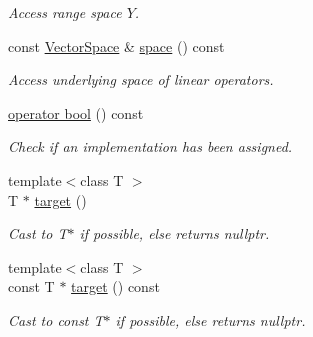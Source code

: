 \begin{DoxyCompactItemize}
\begin{DoxyCompactList}\small\item\em Access range space $Y$. \end{DoxyCompactList}\item 
\hypertarget{classSpacy_1_1LinearOperator_ad0116ec957dfb6bc490a4c9702929f8e}{}const \hyperlink{classSpacy_1_1VectorSpace}{Vector\+Space} \& \hyperlink{classSpacy_1_1LinearOperator_ad0116ec957dfb6bc490a4c9702929f8e}{space} () const \label{classSpacy_1_1LinearOperator_ad0116ec957dfb6bc490a4c9702929f8e}

\begin{DoxyCompactList}\small\item\em Access underlying space of linear operators. \end{DoxyCompactList}\item 
\hypertarget{classSpacy_1_1LinearOperator_a39ea1a7871cbd2ce8f9029298f691bef}{}\hyperlink{classSpacy_1_1LinearOperator_a39ea1a7871cbd2ce8f9029298f691bef}{operator bool} () const \label{classSpacy_1_1LinearOperator_a39ea1a7871cbd2ce8f9029298f691bef}

\begin{DoxyCompactList}\small\item\em Check if an implementation has been assigned. \end{DoxyCompactList}\item 
\hypertarget{structSpacy_1_1Mixin_1_1ToTarget_a3510786172c63a074eda127276d13392}{}{\footnotesize template$<$class T $>$ }\\T $\ast$ \hyperlink{structSpacy_1_1Mixin_1_1ToTarget_a3510786172c63a074eda127276d13392}{target} ()\label{structSpacy_1_1Mixin_1_1ToTarget_a3510786172c63a074eda127276d13392}

\begin{DoxyCompactList}\small\item\em Cast to T$\ast$ if possible, else returns nullptr. \end{DoxyCompactList}\item 
\hypertarget{structSpacy_1_1Mixin_1_1ToTarget_a98985b22f6fc98d253c8416c54a5e359}{}{\footnotesize template$<$class T $>$ }\\const T $\ast$ \hyperlink{structSpacy_1_1Mixin_1_1ToTarget_a98985b22f6fc98d253c8416c54a5e359}{target} () const \label{structSpacy_1_1Mixin_1_1ToTarget_a98985b22f6fc98d253c8416c54a5e359}

\begin{DoxyCompactList}\small\item\em Cast to const T$\ast$ if possible, else returns nullptr. \end{DoxyCompactList}\end{DoxyCompactItemize}
